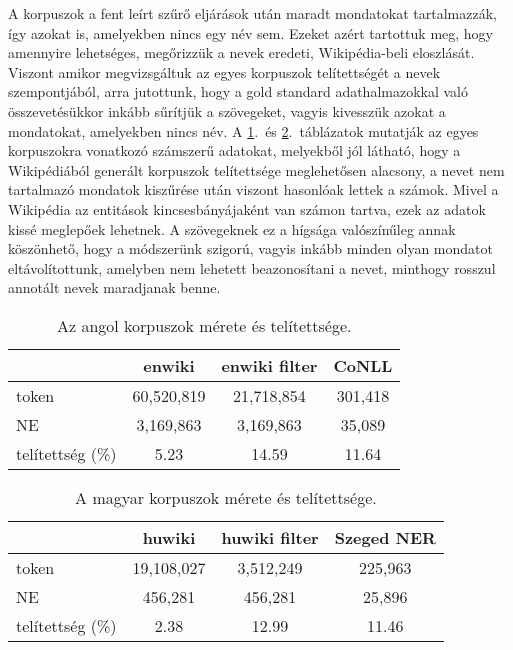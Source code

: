 \documentclass{llncs}
\begin{document}
A korpuszok a fent leírt szűrő eljárások után maradt mondatokat tartalmazzák, így azokat is, amelyekben nincs egy név sem. Ezeket azért tartottuk meg, hogy amennyire lehetséges, megőrizzük a nevek eredeti, Wikipédia-beli eloszlását. Viszont amikor megvizsgáltuk az egyes korpuszok telítettségét a nevek szempontjából, arra jutottunk, hogy a gold standard adathalmazokkal való összevetésükkor inkább sűrítjük a szövegeket, vagyis kivesszük azokat a mondatokat, amelyekben nincs név. A \ref{tab:size_en}.~és \ref{tab:size_hu}.~táblázatok mutatják az egyes korpuszokra vonatkozó számszerű adatokat, melyekből jól látható, hogy a Wikipédiából generált korpuszok telítettsége meglehetősen alacsony, a nevet nem tartalmazó mondatok kiszűrése után viszont hasonlóak lettek a számok. Mivel a Wikipédia az entitások kincsesbányájaként van számon tartva, ezek az adatok kissé meglepőek lehetnek. A szövegeknek ez a hígsága valószínűleg annak köszönhető, hogy a módszerünk szigorú, vagyis inkább minden olyan mondatot eltávolítottunk, amelyben nem lehetett beazonosítani a nevet, minthogy rosszul annotált nevek maradjanak benne. 

\begin{table}[ht]
\begin{center}
\begin{tabular}{lccc}
\toprule  
& \textbf{enwiki} & \textbf{enwiki filter} & \textbf{CoNLL} \\ 
\midrule
token & 60,520,819 & 21,718,854 & 301,418 \\
NE & 3,169,863 & 3,169,863 & 35,089 \\
telítettség (\%) & 5.23 & 14.59 & 11.64 \\
\hline
\end{tabular}
\end{center}
\caption{Az angol korpuszok mérete és telítettsége.}
\label{tab:size_en}
\end{table}
 
\begin{table}[ht]
\begin{center}
\begin{tabular}{lccc}
\toprule
 & \textbf{huwiki} & \textbf{huwiki filter} & \textbf{Szeged NER} \\
\midrule
token & 19,108,027 & 3,512,249  & 225,963 \\
NE & 456,281 & 456,281  & 25,896 \\
telítettség (\%) & 2.38 & 12.99 & 11.46 \\
\bottomrule
\end{tabular}
\end{center}
\caption{A magyar korpuszok mérete és telítettsége.}
\label{tab:size_hu}
\end{table}
\end{document}
